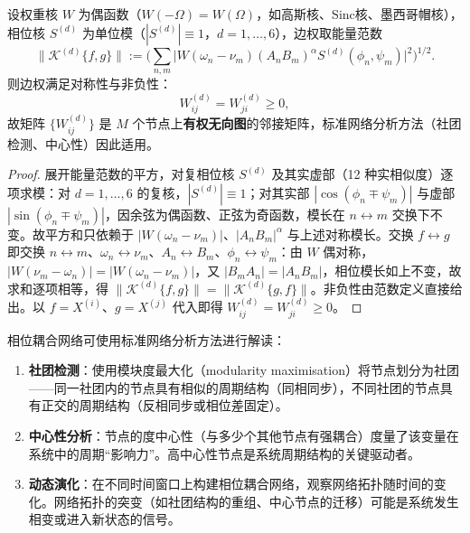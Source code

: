 \begin{lemma}[相位耦合网络的边权对称性]\label{ch31_phase_network_symmetry}
设权重核 $W$ 为偶函数（$W(-\Omega) = W(\Omega)$，如高斯核、Sinc核、墨西哥帽核），相位核 $S^{(d)}$ 为单位模（$|S^{(d)}| \equiv 1$，$d = 1,\dots,6$），边权取能量范数
\[
\big\|\mathcal{K}^{(d)}\{f,g\}\big\| := \Big( \sum_{n,m} \big| W(\omega_n - \nu_m) (A_n B_m)^{\alpha} S^{(d)}(\phi_n, \psi_m) \big|^2 \Big)^{1/2}.
\]
则边权满足对称性与非负性：
\[
W_{ij}^{(d)} = W_{ji}^{(d)} \ge 0,
\]
故矩阵 $\{W_{ij}^{(d)}\}$ 是 $M$ 个节点上\textbf{有权无向图}的邻接矩阵，标准网络分析方法（社团检测、中心性）因此适用。
\end{lemma}

\begin{proof}
展开能量范数的平方，对复相位核 $S^{(d)}$ 及其实虚部（12 种实相似度）逐项求模：对 $d=1,\dots,6$ 的复核，$|S^{(d)}| \equiv 1$；对其实部 $|\cos(\phi_n \mp \psi_m)|$ 与虚部 $|\sin(\phi_n \mp \psi_m)|$，因余弦为偶函数、正弦为奇函数，模长在 $n \leftrightarrow m$ 交换下不变。故平方和只依赖于 $|W(\omega_n - \nu_m)|$、$|A_n B_m|^{\alpha}$ 与上述对称模长。交换 $f \leftrightarrow g$ 即交换 $n \leftrightarrow m$、$\omega_n \leftrightarrow \nu_m$、$A_n \leftrightarrow B_m$、$\phi_n \leftrightarrow \psi_m$：由 $W$ 偶对称，$|W(\nu_m - \omega_n)| = |W(\omega_n - \nu_m)|$，又 $|B_m A_n| = |A_n B_m|$，相位模长如上不变，故求和逐项相等，得 $\|\mathcal{K}^{(d)}\{f,g\}\| = \|\mathcal{K}^{(d)}\{g,f\}\|$。非负性由范数定义直接给出。以 $f = X^{(i)}$、$g = X^{(j)}$ 代入即得 $W_{ij}^{(d)} = W_{ji}^{(d)} \ge 0$。
\end{proof}

\begin{proposition}[相位耦合网络的分析方法]\label{prop:phase_network_analysis}
相位耦合网络可使用标准网络分析方法进行解读：
\begin{enumerate}[label=(\roman*)]
    \item \textbf{社团检测}：使用模块度最大化（modularity maximisation）将节点划分为社团——同一社团内的节点具有相似的周期结构（同相同步），不同社团的节点具有正交的周期结构（反相同步或相位差固定）。
    \item \textbf{中心性分析}：节点的度中心性（与多少个其他节点有强耦合）度量了该变量在系统中的周期“影响力”。高中心性节点是系统周期结构的关键驱动者。
    \item \textbf{动态演化}：在不同时间窗口上构建相位耦合网络，观察网络拓扑随时间的变化。网络拓扑的突变（如社团结构的重组、中心节点的迁移）可能是系统发生相变或进入新状态的信号。
\end{enumerate}
\end{proposition}

